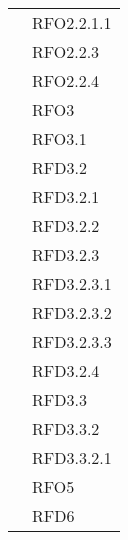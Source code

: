\begin{longtable}{|>{\centering}m{10cm}|m{3cm}<{\centering}|}
& RFO2.2.1.1\\
& RFO2.2.3\\
& RFO2.2.4\\
& RFO3\\
& RFO3.1\\
& RFD3.2\\
& RFD3.2.1\\
& RFD3.2.2\\
& RFD3.2.3\\
& RFD3.2.3.1\\
& RFD3.2.3.2\\
& RFD3.2.3.3\\
& RFD3.2.4\\
& RFD3.3\\
& RFD3.3.2\\
& RFD3.3.2.1\\
& RFO5\\
& RFD6\\ \hline


\end{longtable}
